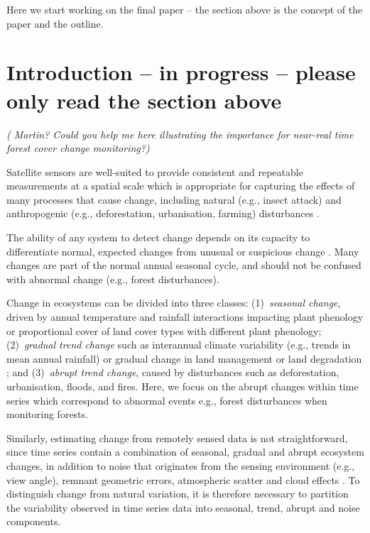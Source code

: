 \documentclass[authoryear,preprint,review,10pt]{elsarticle}
\newcommand{\fixme}[1]{\emph{\marginpar{FIXME} (#1)}}
\begin{document}
\newpage

Here we start working on the final paper -- the section above is the concept of
the paper and the outline.

\section{Introduction -- in progress -- please only read the section above}

\fixme{ Martin? Could you help me here illustrating the importance for near-real time forest cover change monitoring?}


Satellite sensors are well-suited to provide consistent and repeatable
measurements at a spatial scale which is appropriate for capturing the effects
of many processes that cause change, including natural (e.g., insect attack) and
anthropogenic (e.g., deforestation, urbanisation, farming) disturbances
\citep{Jin2005}. 

The ability of any system to detect change depends on its capacity to
differentiate normal, expected changes from unusual or suspicious change
\citep{Hargrove2009}. Many changes are part of the normal annual seasonal cycle,
and should not be confused with abnormal change (e.g., forest disturbances).

Change in ecosystems can be divided into three classes: (1)~\emph{seasonal
change}, driven by annual temperature and rainfall interactions impacting plant
phenology or proportional cover of land cover types with different plant
phenology; (2)~\emph{gradual trend change} such as interannual climate
variability (e.g., trends in mean annual rainfall) or gradual change in land
management or land degradation \citep{Lambin2006}; and (3)~\emph{abrupt trend
change}, caused by disturbances such as deforestation, urbanisation, floods, and
fires. Here, we focus on the abrupt changes within time series which correspond
to abnormal events e.g., forest disturbances when monitoring forests. 

Similarly, estimating change from remotely sensed data is not straightforward, since time
series contain a combination of seasonal, gradual and abrupt ecosystem changes,
in addition to noise that originates from the sensing environment (e.g., view
angle), remnant geometric errors, atmospheric scatter and cloud effects
\citep{Roy2002,Wolfe1998}. To distinguish change from natural variation, it is
therefore necessary to partition the variability observed in time series data
into seasonal, trend, abrupt and noise components.
\end{document}
